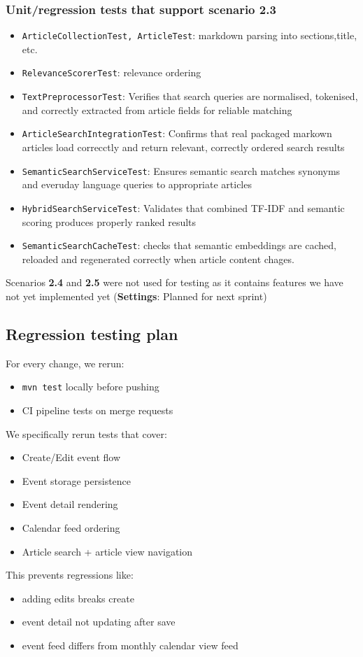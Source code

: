\documentclass[a4paper,12pt]{article}
\begin{document}
\subsubsection{Unit/regression tests that support scenario 2.3}
\begin{itemize}
    \item \texttt{ArticleCollectionTest, ArticleTest}: markdown parsing into sections,title, etc.
    \item \texttt{RelevanceScorerTest}: relevance ordering
    \item \texttt{TextPreprocessorTest}: Verifies that search queries are normalised, tokenised, and correctly extracted from article fields for reliable matching
    \item \texttt{ArticleSearchIntegrationTest}: Confirms that real packaged markown articles load correcctly and return relevant, correctly ordered search results
    \item \texttt{SemanticSearchServiceTest}: Ensures semantic search matches synonyms and everuday language queries to appropriate articles
    \item \texttt{HybridSearchServiceTest}: Validates that combined TF-IDF and semantic scoring produces properly ranked results
    \item \texttt{SemanticSearchCacheTest}: checks that semantic embeddings are cached, reloaded and regenerated
    correctly when article content chages.
 \end{itemize}

Scenarios \textbf{2.4} and \textbf{2.5} were not used for testing as it contains features we have not yet implemented yet (\textbf{Settings}: Planned for next sprint)

\subsection{Regression testing plan}

For every change, we rerun:
\begin{itemize}
    \item \texttt{mvn test} locally before pushing
    \item CI pipeline tests on merge requests
\end{itemize}
We specifically rerun tests that cover:
\begin{itemize}
    \item Create/Edit event flow
    \item Event storage persistence
    \item Event detail rendering
    \item Calendar feed ordering
    \item Article search + article view navigation
\end{itemize}
This prevents regressions like:
\begin{itemize}
    \item adding edits breaks create
    \item event detail not updating after save
    \item event feed differs from monthly calendar view feed
\end{itemize}
\end{document}

